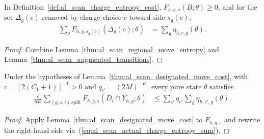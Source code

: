 \begin{lemma}
    \label{thm:al_scan_actual_charge_entropy}
    \leanok
    In Definition~\ref{def:al_scan_charge_entropy_cost},
    $F_{h,g,s}(B;\theta)\ge0$, and for the set $\Delta_g(c)$ removed by charge
    choice $c$ toward side $s_g(c)$,
    \begin{align}
        \sum_g F_{h,g,s_g(c)}(\Delta_g(c);\theta)
         & = \sum_g\eta_{h,c,g}(\theta).
        \label{eq:al_scan_actual_charge_entropy_sum}
    \end{align}
\end{lemma}
\begin{proof}\leanok
    Combine Lemma~\ref{thm:al_scan_regional_move_entropy} and
    Lemma~\ref{thm:al_scan_augmented_transitions}.
\end{proof}

\begin{lemma}
    \label{thm:al_scan_charge_entropy_sampling}
    \leanok
    Under the hypotheses of Lemma~\ref{thm:al_scan_designated_move_cost}, with
    $c=[2(C_1+1)]^{-1}>0$ and $q_{c'}=(2M)^{-K}$, every pure state $\theta$ satisfies
    \begin{align}
        \frac{c}{nD}\sum_{(g,s,i)\ \mathrm{split}}
        F_{h,g,s}(D_i\cap Y_{h,g};\theta)
         & \le \sum_{c'}q_{c'}\sum_g\eta_{h,c',g}(\theta).
        \label{eq:al_scan_charge_entropy_sampling}
    \end{align}
\end{lemma}
\begin{proof}\leanok
    Apply Lemma~\ref{thm:al_scan_designated_move_cost} to $F_{h,g,s}$ and
    rewrite the right-hand side via~(\ref{eq:al_scan_actual_charge_entropy_sum}).
\end{proof}

